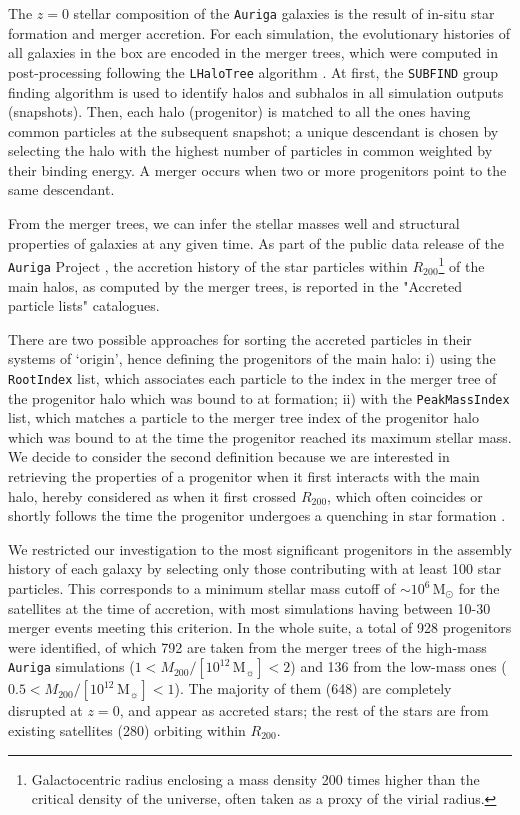 The $z=0$ stellar composition of the \texttt{Auriga} galaxies is the result of in-situ star formation and merger accretion. For each simulation, the evolutionary histories of all galaxies in the box are encoded in the merger trees, which were computed in post-processing following the \texttt{LHaloTree} algorithm \citep{Springel2005b}. At first, the \texttt{SUBFIND} group finding algorithm \citep{Springel2001} is used to identify halos and subhalos in all simulation outputs (snapshots). Then, each halo (progenitor) is matched to all the ones having common particles at the subsequent snapshot; a unique descendant is chosen by selecting the halo with the highest number of particles in common weighted by their binding energy. A merger occurs when two or more progenitors point to the same descendant.  

From the merger trees, we can infer the stellar masses well and structural properties of galaxies at any given time.  As part of the public data release of the \texttt{Auriga} Project \citep{Grand2024a}, the accretion history of the star particles within $R_{200}$\footnote{Galactocentric radius enclosing a mass density 200 times higher than the critical density of the universe, often taken as a proxy of the virial radius.} of the main halos, as computed by the merger trees, is reported in the "Accreted particle lists" catalogues.

There are two possible approaches for sorting the accreted particles in their systems of `origin', hence defining the progenitors of the main halo: i)
using the \texttt{RootIndex} list, which associates each particle to the index in the merger tree of the progenitor halo which was bound to at formation; ii) with the \texttt{PeakMassIndex} list, which matches a particle to the merger tree index of the progenitor halo which was bound to at the time the progenitor reached its maximum stellar mass. We decide to consider the second definition because we are interested in retrieving the properties of a progenitor when it first interacts with the main halo, hereby considered as when it first crossed $R_{200}$, which often coincides or shortly follows the time the progenitor undergoes a quenching in star formation \citep{Kawata2008,Simpson2018,Font2022}. 


We restricted our investigation to the most significant progenitors in the assembly history of each galaxy by selecting only those contributing with at least 100 star particles. This corresponds to a minimum stellar mass cutoff of $\sim10^{6} \, \text{M}_{\odot}$ for the satellites at the time of accretion, with most simulations having between 10-30 merger events meeting this criterion. In the whole suite, a total of 928 progenitors were identified, of which 792 are taken from the merger trees of the high-mass \texttt{Auriga} simulations ($1<M_{200}/[10^{12} \, \mathrm{M}_{\sun}]<2$) and 136 from the low-mass ones ($0.5<M_{200}/[10^{12} \, \mathrm{M}_{\sun}]<1$). The majority of them (648) are completely disrupted at $z=0$, and appear as accreted stars;  the rest of the stars are from existing satellites (280) orbiting within $R_{200}$.

